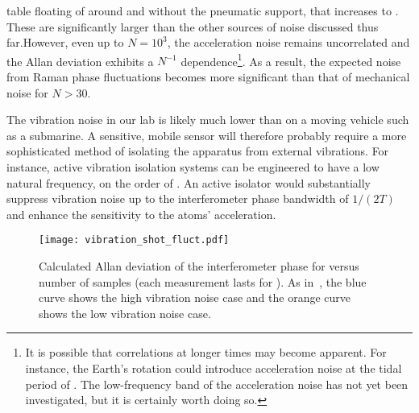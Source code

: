 table floating of around  and without the
pneumatic support, that increases to
. These are significantly larger than the other sources of noise discussed thus
far.However, even up to $N = 10^3$, the acceleration noise remains uncorrelated and
the Allan deviation exhibits a $N^{-1}$
dependence\footnote{It is possible that correlations at longer times may
become apparent. For instance, the Earth's rotation could introduce
acceleration noise at the tidal period of . The
low-frequency band of the acceleration noise has not yet been investigated, but it is certainly worth
doing so.}. As a result, the expected noise from Raman phase
fluctuations becomes more significant than that of mechanical noise
for $N > 30$.  
\par\noindent
The vibration noise in our lab is likely much lower than on a
moving vehicle such as a submarine. 
A sensitive, mobile sensor will therefore probably require a more sophisticated
method of isolating the apparatus from external vibrations. For
instance, active
vibration isolation systems can be engineered to have a low natural
frequency, on the order of
\cite{Zhou2012}. An active isolator would
substantially suppress vibration noise up to the interferometer phase
bandwidth of $1/(2T)$ and enhance the sensitivity to the atoms'
acceleration.
\begin{figure}[htpb]
  \centering
  \texttt{[image: vibration\_shot\_fluct.pdf]}
  \caption{Calculated Allan deviation of the interferometer phase for
    versus number of samples (each measurement lasts for
    ). As in~, the blue curve
shows the high vibration noise case and the orange curve shows the low
vibration noise case.}
  \label{fig:vibration_shot_fluct}
\end{figure}
